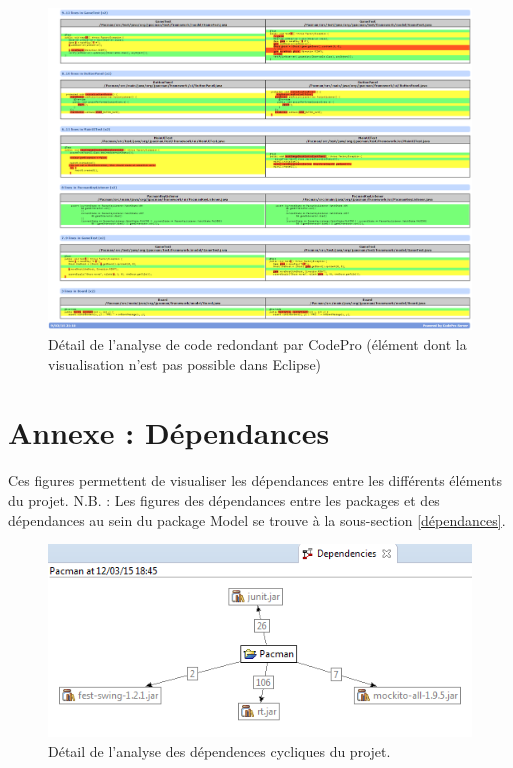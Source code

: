 \documentclass[12pt,a4paper,final]{article}
\begin{document}
\begin{figure}[ht]
	\centering
	\includegraphics[width=\textwidth]{images/SimilarCode_5.png}
	\caption{\label{SimilarCode5}Détail de l'analyse de code redondant par CodePro (élément dont la visualisation n'est pas possible dans Eclipse)}
\end{figure}

\clearpage
\newpage
\section{Annexe : Dépendances}\label{Dependencies}
Ces figures permettent de visualiser les dépendances entre les différents éléments du projet.
N.B. : Les figures des dépendances entre les packages et des dépendances au sein du package Model se trouve  à la sous-section \ref{dépendances}.

\begin{figure}[ht]
	\centering
	\includegraphics[width=\textwidth]{images/DependenciesProject.png}
	\caption{\label{dependenciesP}Détail de l'analyse des dépendences cycliques du projet.}
\end{figure}
\end{document}
